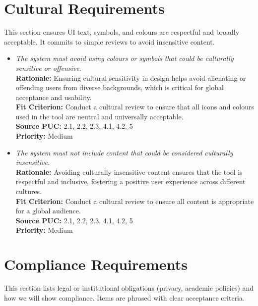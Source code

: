 \documentclass[12pt]{article}
\begin{document}
\section{Cultural Requirements}
This section ensures UI text, symbols, and colours are respectful and broadly
acceptable. It commits to simple reviews to avoid insensitive content.
\begin{itemize}[leftmargin=*]
  \item[CR-1] \emph{The system must avoid using colours or symbols that could be
          culturally sensitive or offensive.}\\[2mm]
        \textbf{Rationale:} Ensuring cultural sensitivity in design helps avoid alienating or offending users from diverse backgrounds, which is critical for global acceptance and usability.\\
        \textbf{Fit Criterion:} Conduct a cultural review to ensure that all icons and colours used in the tool are neutral and universally acceptable.\\
        \textbf{Source PUC:} 2.1, 2.2, 2.3, 4.1, 4.2, 5 \\
        \textbf{Priority:} Medium

  \item[CR-2] \emph{The system must not include content that could be considered
          culturally insensitive.}\\[2mm]
        \textbf{Rationale:} Avoiding culturally insensitive content ensures that the tool is respectful and inclusive, fostering a positive user experience across different cultures.\\
        \textbf{Fit Criterion:} Conduct a cultural review to ensure all content is appropriate for a global audience.\\
        \textbf{Source PUC:} 2.1, 2.2, 2.3, 4.1, 4.2, 5 \\
        \textbf{Priority:} Medium
\end{itemize}

\section{Compliance Requirements}
This section lists legal or institutional obligations (privacy, academic
policies) and how we will show compliance. Items are phrased with clear
acceptance criteria.
\end{document}

